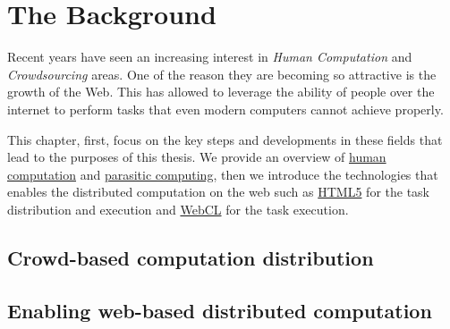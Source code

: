 
\chapter{The Background}
\label{cap:bg}

Recent years have seen an increasing interest in \emph{Human Computation}
and \emph{Crowdsourcing} areas. One of the reason they are becoming
so attractive is the growth of the Web. This has allowed to leverage
the ability of people over the internet to perform tasks that even
modern computers cannot achieve properly.

This chapter, first, focus on the key steps and developments
in these fields that lead to the purposes of this thesis.
We provide an overview of \hyperref[sec:bg:crowd:human]{human computation} and
\hyperref[sec:bg:crowd:parasitic]{parasitic computing}, then we introduce the
technologies that enables the distributed computation on the web such as
{\hyperref[sec:bg:web:html5]{HTML5}} for the task distribution and execution
and {\hyperref[sec:bg:web:webcl]{WebCL}} for the task execution.


\section{Crowd-based computation distribution}
\label{sec:bg:crowd}




\section{Enabling web-based distributed computation}
\label{sec:bg:web}
